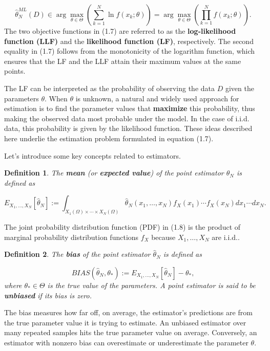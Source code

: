 \documentclass{report}
\newtheorem{definition}{Definition}[chapter]
\begin{document}
\begin{equation}
\hat{\theta}^{ML}_N(D) \in \arg \max_{\theta \in \Theta} \left(\sum_{k=1}^N \ln f(x_k;\theta)\right) = \arg \max_{\theta \in \Theta} \left(\prod_{k=1}^N f(x_k;\theta) \right).
\end{equation}
The two objective functions in (1.7) are referred to as the \textbf{log-likelihood function (LLF)} and the \textbf{likelihood function (LF)}, respectively. The second equality in (1.7) follows from the monotonicity of the logarithm function, which ensures that the LF and the LLF attain their maximum values at the same points.

The LF can be interpreted as the probability of observing the data $D$ given the parameters $\theta$. When $\theta$ is unknown, a natural and widely used approach for estimation is to find the parameter values that \textbf{maximize} this probability, thus making the observed data most probable under the model. In the case of i.i.d. data, this probability is given by the likelihood function. These ideas described here underlie the estimation problem formulated in equation (1.7).

Let’s introduce some key concepts related to estimators.

\begin{definition}
The \textbf{mean} (or \textbf{expected value}) of the point estimator $\hat{\theta}_N$ is defined as

\begin{equation}
E_{X_1,\dots,X_N}[\hat{\theta}_N] := \int_{X_1(\Omega)\times \cdots \times X_N(\Omega)} \hat{\theta}_N(x_1,\dots,x_N)f_X(x_1)\cdots f_X(x_N) dx_1\cdots dx_N.
\end{equation}
\end{definition}
The joint probability distribution function (PDF) in (1.8) is the product of marginal probability distribution functions $f_X$ because $X_1,\dots,X_N$ are i.i.d..

\begin{definition}
The \textbf{bias} of the point estimator $\hat{\theta}_N$ is defined as

\begin{equation}
BIAS(\hat{\theta}_N,\theta_*) := E_{X_1,\dots,X_N}[\hat{\theta}_N] - \theta_*,
\end{equation}
where $\theta_* \in \Theta$ is the true value of the parameters. A point estimator is said to be \textbf{unbiased} if its bias is zero.
\end{definition}
The bias measures how far off, on average, the estimator's predictions are from the true parameter value it is trying to estimate. An unbiased estimator over many repeated samples hits the true parameter value on average. Conversely, an estimator with nonzero bias can overestimate or underestimate the parameter $\theta$.
\end{document}
